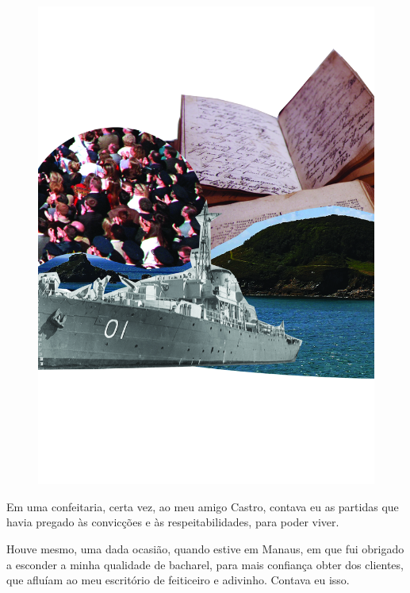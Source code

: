 \pagebreak
\thispagestyle{empty}
\begin{figure}
\includegraphics[width=\textwidth]{./ilustracoes/09_JAVANES.jpg}
\end{figure}
\pagebreak


\noindent{}Em uma confeitaria, certa vez, ao meu amigo Castro, contava eu as
partidas que havia pregado às convicções e às respeitabilidades, para
poder viver.

Houve mesmo, uma dada ocasião, quando estive em Manaus, em que fui
obrigado a esconder a minha qualidade de bacharel, para mais confiança
obter dos clientes, que afluíam ao meu escritório de feiticeiro e
adivinho. Contava eu isso.

